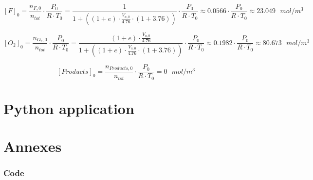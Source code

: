 \documentclass[11pt, a4paper]{article} %
\begin{document}
\begin{equation}
    \left[ F \right]_0 = \frac{n_{F,0}}{n_{tot}} \cdot \frac{P_0}{R \cdot T_0} = \frac{1}{1 + \left( (1+e) \cdot \frac{V_{a,0}}{4.76} \cdot (1+3.76) \right)} \cdot \frac{P_0}{R \cdot T_0} \approx 0.0566 \cdot \frac{P_0}{R \cdot T_0} \approx 23.049 \text{ } mol/m^3
\end{equation}

\begin{equation}
    \left[ O_2 \right]_0 = \frac{n_{O_2,0}}{n_{tot}} \cdot \frac{P_0}{R \cdot T_0} = \frac{(1+e) \cdot \frac{V_{a,0}}{4.76}}{1 + \left( (1+e) \cdot \frac{V_{a,0}}{4.76} \cdot (1+3.76) \right)} \cdot \frac{P_0}{R \cdot T_0} \approx 0.1982 \cdot \frac{P_0}{R \cdot T_0} \approx 80.673 \text{ } mol/m^3
\end{equation}

\begin{equation}
    \left[ Products \right]_0 = \frac{n_{Products,0}}{n_{tot}} \cdot \frac{P_0}{R \cdot T_0} = 0 \text{ } mol/m^3
\end{equation}



\newpage
\part{Python application}


\newpage
\part*{Annexes}
\appendix
\section{Code}
\end{document}
